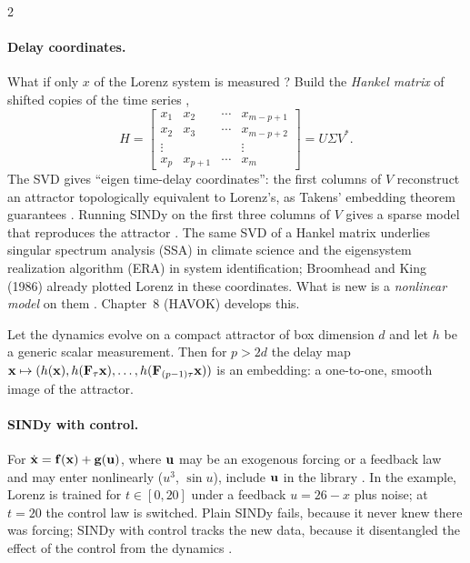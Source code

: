 \begin{paracol}{2}
\paragraph{Delay coordinates.} What if only $x$ of the Lorenz system is measured ?
Build the \emph{Hankel matrix} of shifted copies of the time series ,
\begin{equation}\label{eq:si-hankel}
  H=\begin{bmatrix}x_1&x_2&\cdots&x_{m-p+1}\\ x_2&x_3&\cdots&x_{m-p+2}\\ \vdots&&&\vdots\\ x_p&x_{p+1}&\cdots&x_m\end{bmatrix}
  =U\Sigma V^*.
\end{equation}
The SVD gives ``eigen time-delay coordinates'': the first columns of $V$ reconstruct an attractor
topologically equivalent to Lorenz's, as Takens' embedding theorem guarantees .
Running SINDy on the first three columns of $V$ gives a sparse model that reproduces the attractor
. The same SVD of a Hankel matrix underlies singular spectrum analysis (SSA) in
climate science and the eigensystem realization algorithm (ERA) in system identification; Broomhead and King
(1986) already plotted Lorenz in these coordinates. What is new is a \emph{nonlinear model} on them
. Chapter~8 (HAVOK) develops this.

\begin{theorem}\label{thm:si-takens}
Let the dynamics evolve on a compact attractor of box dimension $d$ and let $h$ be a generic scalar
measurement. Then for $p>2d$ the delay map $\mathbf{x}\mapsto(h(\mathbf{x}),h(\mathbf{F}_{\tau}\mathbf{x}),\dots,h(\mathbf{F}_{(p-1)\tau}\mathbf{x}))$ is
an embedding: a one-to-one, smooth image of the attractor.
\end{theorem}

\paragraph{SINDy with control.} For $\dot{\mathbf{x}}=\mathbf{f}(\mathbf{x})+\mathbf{g}(\mathbf{u})$, where $\mathbf{u}$ may be an
exogenous forcing or a feedback law and may enter nonlinearly ($u^3$, $\sin u$), include $\mathbf{u}$ in the
library . In the example, Lorenz is trained for $t\in[0,20]$
under a feedback $u=26-x$ plus noise; at $t=20$ the control law is switched. Plain SINDy fails, because it
never knew there was forcing; SINDy with control tracks the new data, because it disentangled the effect of
the control from the dynamics .


\end{paracol}
